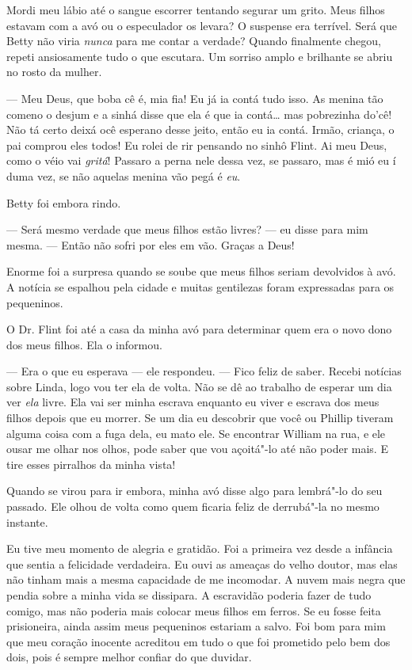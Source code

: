 Mordi meu lábio até o sangue escorrer
tentando segurar um grito. Meus filhos estavam com a avó ou o
especulador os levara? O suspense era terrível. Será que Betty não viria
\emph{nunca} para me contar a verdade? Quando finalmente chegou, repeti
ansiosamente tudo o que escutara. Um sorriso amplo e brilhante se abriu
no rosto da mulher.

--- Meu Deus, que boba cê é, mia fia! Eu já ia contá tudo isso. As
menina tão comeno o desjum e a sinhá disse que ela é que ia
contá\ldots{} mas pobrezinha do'cê! Não tá certo deixá ocê esperano
desse jeito, então eu ia contá. Irmão, criança, o pai comprou eles
todos! Eu rolei de rir pensando no sinhô Flint. Ai meu Deus, como o véio
vai \emph{gritá}! Passaro a perna nele dessa vez, se passaro, mas é mió
eu í duma vez, se não aquelas menina vão pegá é \emph{eu}.

Betty foi embora rindo.

--- Será mesmo verdade que meus filhos estão livres? --- eu disse para
mim mesma. --- Então não sofri por eles em vão. Graças a Deus!

Enorme foi a surpresa quando se soube
que meus filhos seriam devolvidos à avó. A notícia se espalhou pela
cidade e muitas gentilezas foram expressadas para os pequeninos.

O Dr. Flint foi até a casa da minha avó
para determinar quem era o novo dono dos meus filhos. Ela o informou.

--- Era o que eu esperava --- ele respondeu. --- Fico feliz de saber.
Recebi notícias sobre Linda, logo vou ter ela de volta. Não se dê ao
trabalho de esperar um dia ver \emph{ela} livre. Ela vai ser minha
escrava enquanto eu viver e escrava dos meus filhos depois que eu
morrer. Se um dia eu descobrir que você ou Phillip tiveram alguma coisa
com a fuga dela, eu mato ele. Se encontrar William na rua, e ele ousar
me olhar nos olhos, pode saber que vou açoitá"-lo até não poder mais. E
tire esses pirralhos da minha vista!

Quando se virou para ir embora, minha
avó disse algo para lembrá"-lo do seu passado. Ele olhou de volta como
quem ficaria feliz de derrubá"-la no mesmo instante.

Eu tive meu momento de alegria e
gratidão. Foi a primeira vez desde a infância que sentia a felicidade
verdadeira. Eu ouvi as ameaças do velho doutor, mas elas não tinham mais
a mesma capacidade de me incomodar. A nuvem mais negra que pendia sobre
a minha vida se dissipara. A escravidão poderia fazer de tudo comigo,
mas não poderia mais colocar meus filhos em ferros. Se eu fosse feita
prisioneira, ainda assim meus pequeninos estariam a salvo. Foi bom para
mim que meu coração inocente acreditou em tudo o que foi prometido pelo
bem dos dois, pois é sempre melhor confiar do que duvidar.

